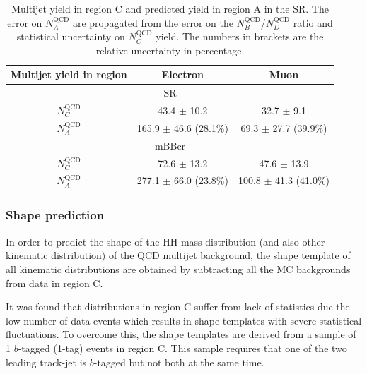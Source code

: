 \begin{table}[!htbp]
\begin{center}
\begin{tabular}{c|c|c}
Multijet yield in region & Electron  & Muon  \\  
\hline
\multicolumn{3}{c}{SR} \\
\hline
$N_C^\text{QCD}$         & 43.4  $\pm$ 10.2 & 32.7 $\pm$ 9.1 \\
$N_A^\text{QCD}$         & 165.9 $\pm$ 46.6 (28.1\%) & 69.3 $\pm$ 27.7 (39.9\%) \\
\hline
\multicolumn{3}{c}{mBBcr} \\
\hline
$N_C^\text{QCD}$       & 72.6  $\pm$ 13.2 & 47.6  $\pm$ 13.9  \\
$N_A^\text{QCD}$       & 277.1 $\pm$ 66.0 (23.8\%) & 100.8 $\pm$ 41.3 (41.0\%)  \\
\hline
\end{tabular}
\end{center}
\caption[Multijet yield in region C and predicted yield in region A in the SR]{Multijet yield in region C and predicted yield in region A in the SR. The error on $N_A^\text{QCD}$
are propagated from the error on the $N_B^\text{QCD}$/$N_D^\text{QCD}$ ratio and statistical uncertainty on $N_C^\text{QCD}$ yield.
The numbers in brackets are the relative uncertainty in percentage.}
\label{tab:boosted_bkgd_abcd_yield}
\end{table}
 
\FloatBarrier
 
%
%
\subsubsection{Shape prediction}
\label{sec:boosted_bkgd_qcdmultijet_shape}
In order to predict the shape of the HH mass distribution (and also other kinematic distribution) of the QCD multijet background, the shape template of all kinematic distributions are obtained by subtracting all the MC backgrounds from data
in region C.
 
It was found that distributions in region C suffer from lack of statistics due the low number of data events which results in shape templates with severe statistical fluctuations. To overcome this, the shape templates are derived from a sample of 1 $b$-tagged (1-tag) events in region C. This sample requires that one of the two leading track-jet is $b$-tagged but not both at the same time.%
 

